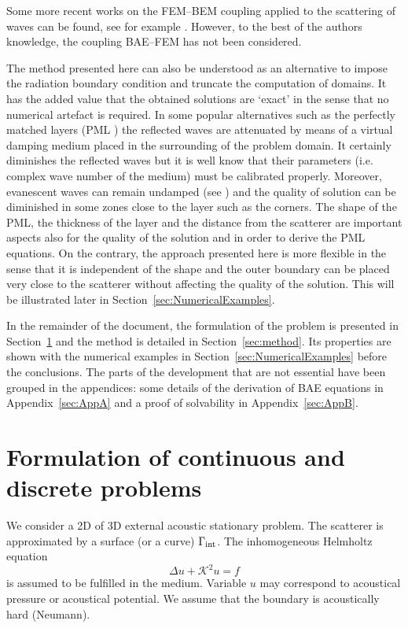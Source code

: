 \documentclass[12pt]{article}
\newcommand{\rin}{{\rm int}}
\newcommand{\K}{\mathcal{K}}
\newcommand{\sref}[1]{Section~\ref{#1}}
\newcommand{\aref}[1]{Appendix~\ref{#1}}
\begin{document}
Some more recent works on the FEM--BEM coupling applied to the scattering of waves can be found, see for example \cite{hsiao:1991, Chiang:2000, Gatica:2009}. However, to the best of the authors knowledge, the coupling BAE--FEM has not been considered.

The method presented here can also be understood as an alternative to impose the radiation boundary condition and truncate the computation of domains. It has the added value that the obtained solutions are `exact' in the sense that no numerical artefact is required. In some popular alternatives such as the perfectly matched layers (PML \cite{Berenger:1994}) the reflected waves are attenuated by means of a virtual damping medium placed in the surrounding of the problem domain. It certainly diminishes the reflected waves but it is well know that their parameters (i.e. complex wave number of the medium) must be calibrated properly. Moreover, evanescent waves can remain undamped (see \cite{zampolli:2008,basu:2003}) and the quality of solution can be diminished in some zones close to the layer such as the corners. The shape of the PML, the thickness of the layer and the distance from the scatterer are important aspects also for the quality of the solution and in order to derive the PML equations. On the contrary, the approach presented here is more flexible in the sense that it is independent of the shape and the outer boundary can be placed very close to the scatterer without affecting the quality of the solution. This will be illustrated later in \sref{sec:NumericalExamples}.

In the remainder of the document, the formulation of the problem  is presented in \sref{sec:formulation} and the method is detailed in \sref{sec:method}. Its properties are shown with the numerical examples in \sref{sec:NumericalExamples} before the conclusions. The parts of the development that are not essential have been grouped in the appendices: some details of the derivation of BAE equations in \aref{sec:AppA} and a proof of solvability in \aref{sec:AppB}.





\section{Formulation of continuous and discrete problems}
\label{sec:formulation}

We consider a 2D of 3D external acoustic stationary problem. The scatterer is approximated by a surface (or a curve)
$\Gamma_\rin$.
The inhomogeneous Helmholtz equation
\begin{equation}
\Delta u + \K^2 u = f
\label{eq0201}
\end{equation}
is assumed to be fulfilled in the medium. Variable $u$ may correspond to acoustical pressure or acoustical potential.
We assume that the boundary is acoustically hard (Neumann).
\end{document}
